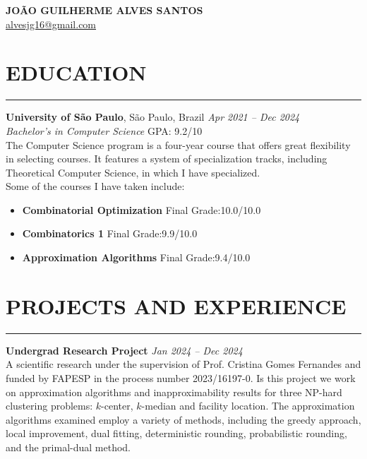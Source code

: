 \documentclass[a4paper,10pt]{article}
\begin{document}
\begin{center}
    {\LARGE \textbf{JOÃO GUILHERME ALVES SANTOS}} \\
    \vspace{0.2cm}
    \href{mailto:alvesjg16@gmail.com}{alvesjg16@gmail.com}

\end{center}

\section*{EDUCATION}
\vspace{-1.5em} %
\noindent\rule{\textwidth}{0.4pt} %

\noindent\textbf{University of São Paulo}, São Paulo, Brazil \hfill  \textit{Apr 2021 -- Dec 2024} \\
\textit{Bachelor's in Computer Science} \hfill GPA: 9.2/10 \\
The Computer Science program is a four-year course that offers great flexibility in selecting courses. It features a system of specialization tracks, including Theoretical Computer Science, in which I have specialized. \\
Some of the courses I have taken include:
\begin{itemize}[leftmargin=0.3cm]
\item \textbf{Combinatorial Optimization} \hfill Final Grade:\@ 10.0/10.0
\item \textbf{Combinatorics 1 } \hfill Final Grade:\@ 9.9/10.0
\item \textbf{Approximation Algorithms} \hfill Final Grade:\@ 9.4/10.0
\end{itemize}


\section*{PROJECTS AND EXPERIENCE}
\vspace{-1.5em} %
\noindent\rule{\textwidth}{0.4pt} %

\noindent\textbf{Undergrad Research Project}  \hfill  \textit{Jan 2024 -- Dec 2024} \\
A scientific research under the supervision of Prof. Cristina Gomes Fernandes and funded by FAPESP in the 
process number 2023/16197-0. Is this project we work on approximation algorithms and inapproximability results for three NP-hard clustering problems: $k$-center, $k$-median and facility location. The approximation algorithms examined employ a variety of methods, including the greedy approach, local improvement, dual fitting, deterministic rounding, probabilistic rounding, and the primal-dual method.\\
\end{document}

